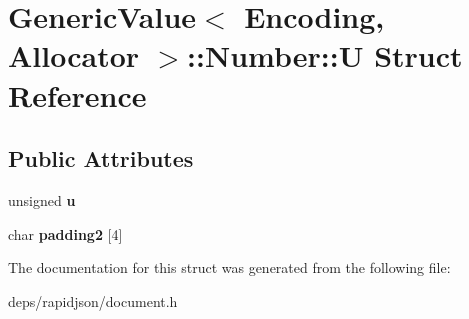 \hypertarget{struct_generic_value_1_1_number_1_1_u}{}\section{Generic\+Value$<$ Encoding, Allocator $>$\+:\+:Number\+:\+:U Struct Reference}
\label{struct_generic_value_1_1_number_1_1_u}
\subsection*{Public Attributes}
\begin{DoxyCompactItemize}
\item 
unsigned {\bfseries u}\hypertarget{struct_generic_value_1_1_number_1_1_u_a175e3a2bd43e6880791eb7c950d2f147}{}\label{struct_generic_value_1_1_number_1_1_u_a175e3a2bd43e6880791eb7c950d2f147}

\item 
char {\bfseries padding2} \mbox{[}4\mbox{]}\hypertarget{struct_generic_value_1_1_number_1_1_u_af219e8d5d731960d7556e0d00b899c7c}{}\label{struct_generic_value_1_1_number_1_1_u_af219e8d5d731960d7556e0d00b899c7c}

\end{DoxyCompactItemize}


The documentation for this struct was generated from the following file\+:\begin{DoxyCompactItemize}
\item 
deps/rapidjson/document.\+h\end{DoxyCompactItemize}
